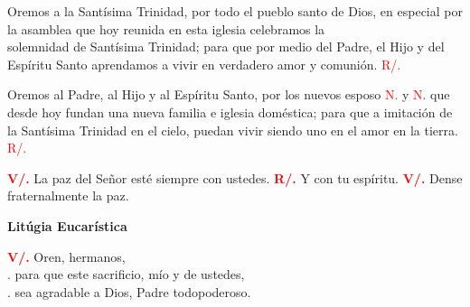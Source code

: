\documentclass[12pt, letterpaper, spanish]{report}
\begin{document}

\Large Oremos a la Sant\'isima Trinidad, por todo el pueblo santo de Dios, 
en especial por la asamblea que hoy reunida en esta iglesia celebramos 
la\\ solemnidad de Sant\'isima Trinidad; para que por medio del Padre, 
el Hijo y del Esp\'iritu Santo aprendamos a vivir en verdadero amor 
y comuni\'on. \textcolor{red}{R/.}\newline


\Large Oremos al Padre, al Hijo y al Esp\'iritu Santo, 
por los nuevos esposo \textcolor{red}{N.} y \textcolor{red}{N.} 
que desde hoy fundan una nueva familia e iglesia dom\'estica;
para que a imitaci\'on de la Sant\'isima Trinidad en el cielo, 
puedan vivir siendo uno en el amor en la tierra. \textcolor{red}{R/.}\newline

\Large \hspace{-0.9cm} {\bfseries \textcolor{red}{V/.}} \hspace{0.5cm} La paz del Se\~nor est\'e siempre con ustedes. \newline
\Large \hspace{-0.9cm} {\bfseries \textcolor{red}{R/.}} \hspace{0.5cm} Y con tu esp\'iritu. \newline
\Large \hspace{-0.9cm} {\bfseries \textcolor{red}{V/.}} \hspace{0.5cm} Dense fraternalmente la paz. \newline

\begin{center}
\Huge {\bfseries Lit\'ugia Eucar\'istica}
\end{center}

\Large \hspace{-0.9cm} {\bfseries \textcolor{red}{V/.}} \hspace{0.5cm} Oren, hermanos, \\
.\hspace{1.5cm} para que este sacrificio, m\'io y de ustedes, \\
.\hspace{1.5cm} sea agradable a Dios, Padre todopoderoso. \newline
\end{document}
